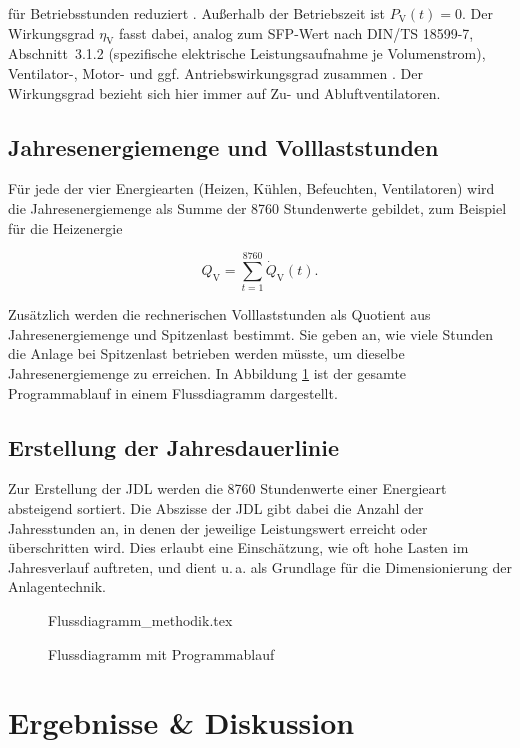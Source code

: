 \documentclass{scrreprt}
\begin{document}
für Betriebsstunden reduziert \parencite{DIN185993}. Außerhalb der
Betriebszeit ist $P_{\mathrm{V}}(t) = 0$. Der Wirkungsgrad
$\eta_{\mathrm{V}}$ fasst dabei, analog zum \ac{SFP}-Wert nach
DIN/TS 18599-7, Abschnitt~3.1.2 (spezifische elektrische
Leistungsaufnahme je Volumenstrom), Ventilator-, Motor- und ggf.
Antriebswirkungsgrad zusammen \parencite{DIN185997}. Der Wirkungsgrad bezieht sich hier immer auf Zu- und Abluftventilatoren.

\section{Jahresenergiemenge und Volllaststunden}
Für jede der vier Energiearten (Heizen, Kühlen, Befeuchten,
Ventilatoren) wird die Jahresenergiemenge als Summe der 8760
Stundenwerte gebildet, zum Beispiel für die Heizenergie

\begin{equation}
    Q_{\mathrm{V}} = \sum_{t=1}^{8760} \dot Q_{\mathrm{V}}(t).
\end{equation}

Zusätzlich werden die rechnerischen Volllaststunden als Quotient aus
Jahresenergiemenge und Spitzenlast bestimmt. Sie geben an, wie viele
Stunden die Anlage bei Spitzenlast betrieben werden müsste, um
dieselbe Jahresenergiemenge zu erreichen. In Abbildung \ref{abb:Flussdiagramm} ist der gesamte Programmablauf in einem Flussdiagramm dargestellt.

\section{Erstellung der Jahresdauerlinie}
Zur Erstellung der \ac{JDL} werden die 8760 Stundenwerte einer
Energieart absteigend sortiert. Die Abszisse der \ac{JDL} gibt dabei
die Anzahl der Jahresstunden an, in denen der jeweilige Leistungswert
erreicht oder überschritten wird. Dies erlaubt eine Einschätzung, wie
oft hohe Lasten im Jahresverlauf auftreten, und dient u.\,a. als
Grundlage für die Dimensionierung der Anlagentechnik. 

\begin{figure}[H]
\centering
{Flussdiagramm_methodik.tex}
\caption{Flussdiagramm mit Programmablauf}
\label{abb:Flussdiagramm}
\end{figure}

\chapter{Ergebnisse \& Diskussion}\label{chap:Ergebnisse}
\end{document}
